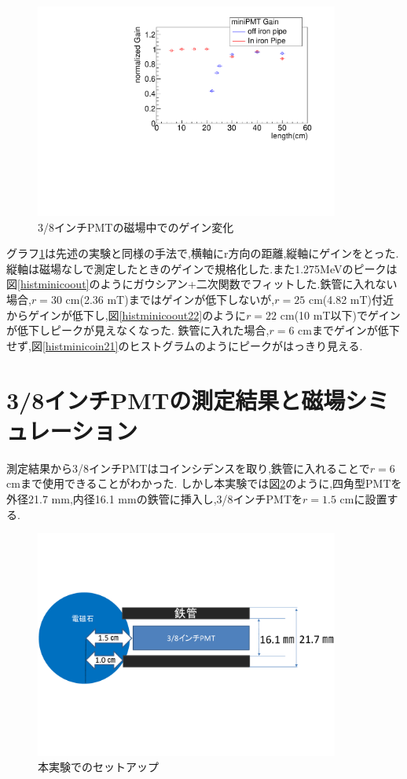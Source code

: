 \begin{figure}[h]
	\centering
		\includegraphics[angle=-90,width=10cm]{fig/iguchi/miniPMTgainG.pdf}
	\caption{3/8インチPMTの磁場中でのゲイン変化}
	\label{miniPMTgainG}
\end{figure}

グラフ\ref{miniPMTgainG}は先述の実験と同様の手法で,横軸にr方向の距離,縦軸にゲインをとった.縦軸は磁場なしで測定したときのゲインで規格化した.また1.275MeVのピークは図\ref{histminicoout}のようにガウシアン+二次関数でフィットした.鉄管に入れない場合,$r=30$ cm(2.36 mT)まではゲインが低下しないが,$r=25$ cm(4.82 mT)付近からゲインが低下し,図\ref{histminicoout22}のように$r=22$ cm(10 mT以下)でゲインが低下しピークが見えなくなった.
鉄管に入れた場合,$r=6$ cmまでゲインが低下せず,図\ref{histminicoin21}のヒストグラムのようにピークがはっきり見える.


\section{3/8インチPMTの測定結果と磁場シミュレーション}
測定結果から3/8インチPMTはコインシデンスを取り,鉄管に入れることで$r=6$ cmまで使用できることがわかった.
しかし本実験では図\ref{honjikken}のように,四角型PMTを外径21.7 mm,内径16.1 mmの鉄管に挿入し,3/8インチPMTを$r=1.5$ cmに設置する.

\begin{figure}[H]
	\centering
		\includegraphics[width=10cm]{fig/iguchi/honjikken.pdf}
	\caption{本実験でのセットアップ}
	\label{honjikken}
\end{figure}

